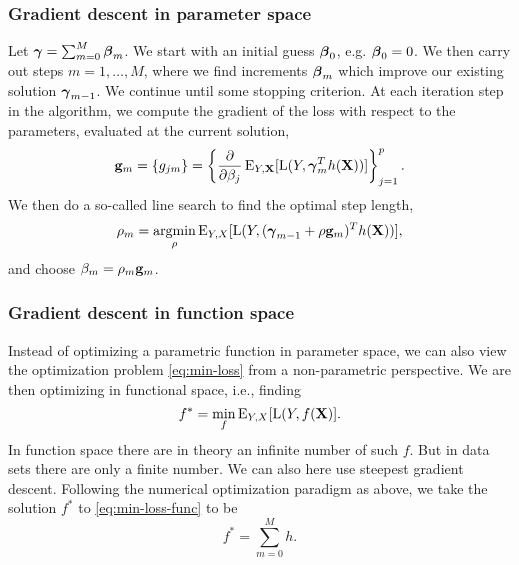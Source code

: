 \subsubsection{Gradient descent in parameter space}
Let $\boldsymbol{\gamma}=\sum_{m=0}^M\boldsymbol{\beta}_m$. We start with an initial guess $\boldsymbol{\beta}_0$, e.g. $\boldsymbol{\beta}_0=0$. We then carry out steps $m=1,\dotsc,M$, where we find increments $\boldsymbol{\beta}_m$ which improve our existing solution $\boldsymbol{\gamma}_{m-1}$. We continue until some stopping criterion. At each iteration step in the algorithm, we compute the gradient of the loss with respect to the parameters, evaluated at the current solution,
\begin{equation}
    \mathbf{g}_m=\{g_{jm}\}=\left\{\frac{\partial}{\partial\beta_j}\operatorname{E}_{Y,\mathbf{X}}[\operatorname{L}(Y,\boldsymbol{\gamma}_{m}^Th(\mathbf{X}))]\right\}_{j=1}^{p}.
\end{equation}
We then do a so-called line search to find the optimal step length,
\begin{equation}
    \rho_m=\underset{\rho}{\operatorname{argmin}}\operatorname{E}_{Y,X}[\operatorname{L}(Y,(\boldsymbol{\gamma}_{m-1}+\rho \mathbf{g}_m)^Th(\mathbf{X}))],
\end{equation}
and choose $\beta_m=\rho_m\mathbf{g}_m$.

\subsubsection*{Gradient descent in function space}
Instead of optimizing a parametric function in parameter space, we can also view the optimization problem \eqref{eq:min-loss} from a non-parametric perspective. We are then optimizing in functional space, i.e., finding
\begin{equation}\label{eq:min-loss-func}
    f^*=\underset{f}{\min}\operatorname{E}_{Y,X}[\operatorname{L}(Y,f(\mathbf{X})].
\end{equation}
In function space there are in theory an infinite number of such $f$. But in data sets there are only a finite number. We can also here use steepest gradient descent. Following the numerical optimization paradigm as above, we take the solution $f^*$ to \eqref{eq:min-loss-func} to be
\begin{equation}
    f^*=\sum_{m=0}^Mh.
\end{equation}
